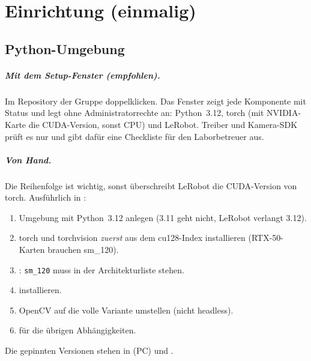 \chapter{Einrichtung (einmalig)}
\label{ch:einrichtung}

\section{Python-Umgebung}

\paragraph{Mit dem Setup-Fenster (empfohlen).} Im Repository der Gruppe
 doppelklicken. Das Fenster zeigt jede Komponente mit Status und legt
ohne Administratorrechte  an: Python~3.12, torch (mit
NVIDIA-Karte die CUDA-Version, sonst CPU) und LeRobot. Treiber und Kamera-SDK prüft es nur und
gibt dafür eine Checkliste für den Laborbetreuer aus.

\paragraph{Von Hand.} Die Reihenfolge ist wichtig, sonst überschreibt LeRobot die CUDA-Version
von torch. Ausführlich in :
\begin{enumerate}
  \item Umgebung mit Python~3.12 anlegen (3.11 geht nicht, LeRobot verlangt 3.12).
  \item torch und torchvision \emph{zuerst} aus dem cu128-Index installieren
    (RTX-50-Karten brauchen sm\_120).
  \item {}: \texttt{sm\_120} muss in der Architekturliste stehen.
  \item {} installieren.
  \item OpenCV auf die volle Variante umstellen (nicht headless).
  \item {} für die übrigen Abhängigkeiten.
\end{enumerate}
Die gepinnten Versionen stehen in  (PC) und
.


